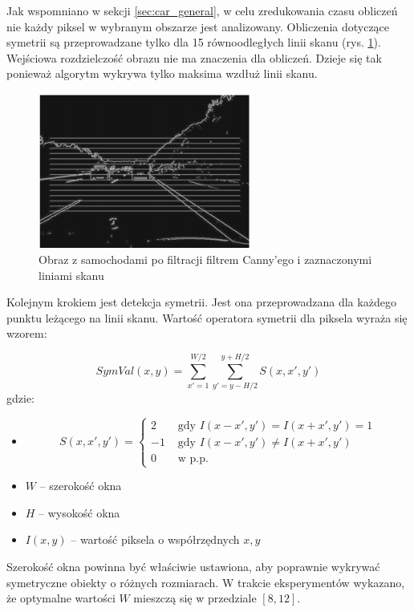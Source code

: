 Jak wspomniano w sekcji \ref{sec:car_general}, w celu zredukowania czasu obliczeń nie każdy piksel w wybranym obszarze jest analizowany. Obliczenia dotyczące symetrii są przeprowadzane tylko dla 15 równoodległych linii skanu (rys. \ref{fig:car_scan_lines1}). Wejściowa rozdzielczość obrazu nie ma znaczenia dla obliczeń. Dzieje się tak ponieważ algorytm wykrywa tylko maksima wzdłuż linii skanu.

\begin{figure}
  \centering
  \includegraphics[width=7cm]{img/car_lines.png}
  \caption{Obraz z samochodami po filtracji filtrem Canny'ego i zaznaczonymi liniami skanu\cite{T1}}
  \label{fig:car_scan_lines1}
\end{figure}

Kolejnym krokiem jest detekcja symetrii. Jest ona przeprowadzana dla każdego punktu leżącego na linii skanu. Wartość operatora symetrii dla piksela wyraża się wzorem:

\begin{equation}
SymVal(x,y)=\sum_{x'=1}^{W/2}\sum_{y'=y-H/2}^{y+H/2}S(x, x', y')
\end{equation}
gdzie:
\begin{itemize}
\item
\begin{equation}
S(x,x',y')=\begin{cases}
2 & \text{ gdy } I(x-x',y')=I(x+x',y')=1 \\ 
-1 & \text{ gdy } I(x-x',y')\neq I(x+x',y') \\ 
0 & \text{ w p.p. }
\end{cases}
\end{equation}
\item $W$ -- szerokość okna
\item $H$ -- wysokość okna
\item $I(x,y)$ -- wartość piksela o współrzędnych $x,y$
\end{itemize}

Szerokość okna powinna być właściwie ustawiona, aby poprawnie wykrywać symetryczne obiekty o różnych rozmiarach. W trakcie eksperymentów wykazano, że optymalne wartości $W$ mieszczą się w przedziale $[8,12]$.

